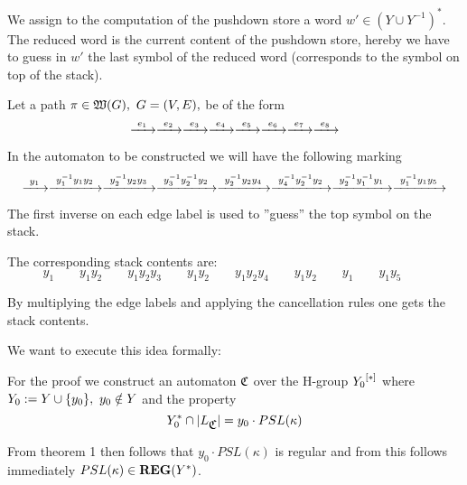 We assign to the computation of the pushdown store a word $w' \in (Y\cup
Y^{-1})^*$. The reduced word is the current content of the pushdown store,
hereby we have to guess in $w'$ the last symbol of the reduced word
(corresponds to the symbol on top of the stack).

Let a path $\pi \in \pathcat{G},\ G=(V,E),$ be of the form
\[ \xrightarrow{\ {e_1}\ } \xrightarrow{\ {e_2}\ } \xrightarrow{\ {e_3}\ } \xrightarrow{\ {e_4}\ } \xrightarrow{\ {e_5}\ } \xrightarrow{\ {e_6}\ } \xrightarrow{\ {e_7}\ }
\xrightarrow{\ {e_8}\ } \]

In the automaton to be constructed we will have the following marking
\[ \xrightarrow{\ {y_1}\ } \xrightarrow{\ {y_1^{-1} y_1 y_2}\ } \xrightarrow{\ {y_2^{-1} y_2 y_3}\ } \xrightarrow{\ {y_3^{-1}
y_2^{-1} y_2}\ } \xrightarrow{\ {y_2^{-1} y_2 y_4}\ } \xrightarrow{\ {y_4^{-1} y_2^{-1} y_2}\ }
\xrightarrow{\ {y_2^{-1} y_1^{-1} y_1}\ } \xrightarrow{\ {y_1^{-1} y_1 y_5}\ }
\]

The first inverse on each edge label is used to ''guess'' the top symbol on
the stack.

The corresponding stack contents are:
\[ y_1 \qquad y_1 y_2 \qquad y_1 y_2 y_3 \qquad y_1 y_2 \qquad y_1 y_2 y_4
\qquad y_1 y_2 \qquad y_1 \qquad y_1 y_5 \qquad \]

By multiplying the edge labels and applying the cancellation rules one gets the
stack contents.

We want to execute this idea formally:

For the proof we construct an automaton $\mbox{$\mathfrak{C}$}$ over the H-group $\mbox{${Y_0}^{[*]}$}$
where $Y_0 := Y \cup \mbox{$\{y_0\}$},\ y_0 \notin Y$ and the property
\[ Y_0^* \cap |L_{\mbox{$\mathfrak{C}$}}| = y_0 \cdot PSL(\kappa) \]

From theorem 1 then follows that $y_0 \cdot PSL(\kappa)$ is regular and from
this follows immediately $PSL(\kappa) \in \mbox{{\bf REG}}(Y^*)$.


